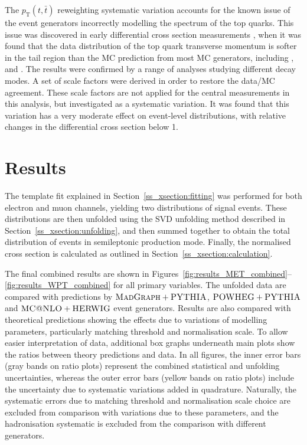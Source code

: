 The $p_\mathrm{T}(t,\bar{t})$ reweighting systematic variation accounts for the known issue of the event generators
incorrectly modelling the \pt spectrum of the top quarks. This issue was discovered in early differential cross section
measurements \autocite{CMS_diff_xsections_7TeV}, when it was found that the data distribution of the top quark
transverse momentum is softer in the tail region than the MC prediction from most MC generators, including \MADGRAPH,
\POWHEG and \MCATNLO. The results were confirmed by a range of analyses studying different \ttbar decay modes. A set of
scale factors were derived in order to restore the data/MC agreement. These scale factors are not applied for the
central measurements in this analysis, but investigated as a systematic variation. It was found that this variation has
a very moderate effect on event-level distributions, with relative changes in the differential cross section below
\SI{1}{\pc}.



\section{Results}
\label{s_xsection:results}
The template fit explained in Section~\ref{ss_xsection:fitting} was performed for both electron and muon channels,
yielding two distributions of signal \ttbar events. These distributions are then unfolded using the SVD unfolding method
described in Section~\ref{ss_xsection:unfolding}, and then summed together to obtain the total distribution of \ttbar
events in semileptonic production mode. Finally, the normalised cross section is calculated as outlined in
Section~\ref{ss_xsection:calculation}.

The final combined results are shown in Figures~\ref{fig:results_MET_combined}--\ref{fig:results_WPT_combined} for all
primary variables. The unfolded data are compared with predictions by $\textsc{MadGraph}+{\textsc{PYTHIA}}$, ${\textsc{POWHEG}}+{\textsc{PYTHIA}}$ and
$\textsc{MC@NLO}+{\textsc{HERWIG}}$ event generators. Results are also compared with theoretical predictions showing the effects due to
variations of modelling parameters, particularly matching threshold and normalisation scale. To allow easier
interpretation of data, additional box graphs underneath main plots show the ratios between theory predictions and data.
In all figures, the inner error bars (gray bands on ratio plots) represent the combined statistical and unfolding
uncertainties, whereas the outer error bars (yellow bands on ratio plots) include the uncertainty due to systematic
variations added in quadrature. Naturally, the systematic errors due to matching threshold and normalisation scale
choice are excluded from comparison with variations due to these parameters, and the hadronisation systematic is
excluded from the comparison with different generators.

